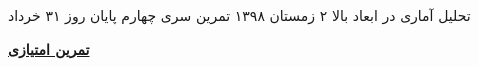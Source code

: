 \documentclass{article}
\begin{document}
\handout
{{تحلیل آماری در ابعاد بالا}}
{۲}
{زمستان ۱۳۹۸}
{تمرین سری چهارم}
{پایان روز ۳۱ خرداد }
\vspace{0.1cm}
\vspace{0.1cm}








\newpage
 \underline{\Large\textbf{تمرین امتیازی}}



\end{document}

